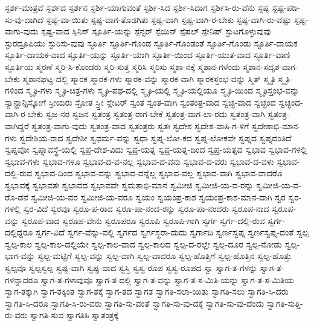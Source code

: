 {ಸ್ಪರ್ಶ-ಮಾತ್ರವೆ
ಸ್ಪರ್ಶದ
ಸ್ಪರ್ಶನ
ಸ್ಪರ್ಶಿ-ಯಾಗುವಂತೆ
ಸ್ಪರ್ಶಿ-ಸಿದ
ಸ್ಪರ್ಶಿ-ಸಿದಾಗ
ಸ್ಪರ್ಶಿಸಿ-ರು-ವೆನು
ಸ್ಪಷ್ಟ
ಸ್ಪಷ್ಟ-ಪಡಿ-ಸು-ವು-ದಾಗಿದೆ
ಸ್ಪಷ್ಟ-ವಾ-ಯಿತು
ಸ್ಪಷ್ಟ-ವಾಗ-ತೊಡಗಿತು
ಸ್ಪಷ್ಟ-ವಾಗಿ
ಸ್ಪಷ್ಟ-ವಾಗಿ-ರ-ಬೇಕು
ಸ್ಪಷ್ಟ-ವಾಗಿ-ರು-ವಷ್ಟು
ಸ್ಪಷ್ಟ-ವಾಗು-ವುದು
ಸ್ಪಷ್ಟ-ವಾದ
ಸ್ಪಿನಿಸ್
ಸ್ಪೂರ್ತಿ-ಯನ್ನು
ಸ್ಪೆನ್ಸರ್
ಸ್ಪೆಯಿನ್
ಸ್ಪೆಷಲ್
ಸ್ಪೇನಿಷ್
ಸ್ಫುಟಗೊಳ್ಳುವುವು
ಸ್ಫುರದ್ರೂಪಿಯು
ಸ್ಫುರಿಸು-ವುವು
ಸ್ಫೂರ್ತಿ
ಸ್ಫೂರ್ತಿ-ಗೊಂಡ
ಸ್ಫೂರ್ತಿ-ಗೊಂಡಂತೆ
ಸ್ಫೂರ್ತಿ-ಗೊಂಡು
ಸ್ಫೂರ್ತಿ-ದಾಯಕ
ಸ್ಫೂರ್ತಿ-ದಾಯಕ-ವಾದ
ಸ್ಫೂರ್ತಿ-ಯನ್ನು
ಸ್ಫೂರ್ತಿ-ಯಾಗಿ
ಸ್ಫೂರ್ತಿ-ಯಿಂದ
ಸ್ಫೂರ್ತಿ-ಯುತ-ವಾದ
ಸ್ಫೂರ್ತಿ-ವಾಣಿ
ಸ್ಫೂರ್ತಿಯ
ಸ್ಮರಣೆ
ಸ್ಮರಿ-ಸಿ-ಕೊಂಡರು
ಸ್ಮರಿ-ಸುತ್ತ
ಸ್ಮರಿಸಿ
ಸ್ಮರಿಸು
ಸ್ಮಶಾ-ನಕ್ಕೆ
ಸ್ಮಶಾನ-ಗಳೆಂದು
ಸ್ಮಶಾನ-ಸದೃಶ-ವಾಗ-ಬೇಕು
ಸ್ಮಶಾನಘಟ್ಟ-ದಲ್ಲಿ
ಸ್ಮಾರಕ
ಸ್ಮಾರಕ-ಗಳು
ಸ್ಮಾರಕ-ವನ್ನು
ಸ್ಮಾರಕ-ವಾಗಿ
ಸ್ಮಾರಕಸ್ತಂಭ-ವನ್ನು
ಸ್ಮಿತ್
ಸ್ಮೃತಿ
ಸ್ಮೃತಿ-ಗಳಿಂದ
ಸ್ಮೃತಿ-ಗಳು
ಸ್ಮೃತಿ-ಚಿತ್ರ-ಗಳು
ಸ್ಮೃತಿ-ಪಥ-ದಲ್ಲಿ
ಸ್ಮೃತಿ-ಯಲ್ಲಿ
ಸ್ಮೃತಿ-ಯಲ್ಲಿಯೂ
ಸ್ಮೃತಿ-ಯಿಂದ
ಸ್ಮೃತಿಸ್ತಂಭ-ವನ್ನು
ಸ್ಯಾನ್ಫ್ರಾನ್ಸಿಸ್ಕೋಗೆ
ಸ್ರೀಯರು
ಸ್ರೋತ
ಸ್ರ್ತೀ
ಸ್ಲೇಟರ್
ಸ್ವಂತ
ಸ್ವಂತ-ವಾಗಿ
ಸ್ವಂತಂತ್ರ-ವಾದ
ಸ್ವಚ್ಛ-ವಾದ
ಸ್ವಚ್ಛಂದ
ಸ್ವಚ್ಛಂದ-ವಾಗಿ-ರ-ಬೇಕು
ಸ್ವಜ-ನರ
ಸ್ವಜನ
ಸ್ವತಂತ್ರ
ಸ್ವತಂತ್ರ-ರಾಗ-ಬೇಕೆ
ಸ್ವತಂತ್ರ-ವಾಗ-ಲಾ-ರದು
ಸ್ವತಂತ್ರ-ವಾಗಿ
ಸ್ವತಂತ್ರ-ವಾಗಿದ್ದರೆ
ಸ್ವತಂತ್ರ-ವಾಗು-ವುದು
ಸ್ವತಂತ್ರ-ವಾದ
ಸ್ವತಂತ್ರರು
ಸ್ವತಃ
ಸ್ವದೇಶ
ಸ್ವದೇಶ-ವಾಸಿ-ಗ-ಳಿಗೆ
ಸ್ವದೇಶಾಭಿ-ಮಾನ-ಗಳು
ಸ್ವದೇಶಿಯ-ರಾದ
ಸ್ವದೇಶೀ
ಸ್ವಧರ್ಮ-ವನ್ನು
ಸ್ವಧಾ
ಸ್ವಪ್ನ-ಲೋ-ಕದ
ಸ್ವಪ್ನ-ಲೋಕವೇ
ಸ್ವಪ್ನದ
ಸ್ವಪ್ನದಂತಿದೆ
ಸ್ವಪ್ನವೋ
ಸ್ವಪ್ನಾವಸ್ಥೆ-ಯಲ್ಲಿ
ಸ್ವಪ್ರ-ದೇಶ-ವಿದು
ಸ್ವಪ್ರ-ಯತ್ನ
ಸ್ವಪ್ರ-ಯತ್ನ-ದಿಂದ
ಸ್ವಪ್ರ-ಯತ್ನದ
ಸ್ವಭಾವ
ಸ್ವಭಾವ-ಗಳಲ್ಲಿ
ಸ್ವಭಾವ-ಗಳು
ಸ್ವಭಾವ-ಗಳೂ
ಸ್ವಭಾವ-ದ-ವ-ನಲ್ಲ
ಸ್ವಭಾವ-ದ-ವನು
ಸ್ವಭಾವ-ದ-ವರು
ಸ್ವಭಾವ-ದ-ವಳು
ಸ್ವಭಾವ-ದಲ್ಲಿ-ರುವ
ಸ್ವಭಾವ-ದಿಂದ
ಸ್ವಭಾವ-ವನ್ನು
ಸ್ವಭಾವ-ವನ್ನೆಲ್ಲ
ಸ್ವಭಾವ-ವಲ್ಲ
ಸ್ವಭಾವ-ವಾಗಿ
ಸ್ವಭಾವ-ವಾದರೊ
ಸ್ವಭಾವಕ್ಕೆ
ಸ್ವಭಾವತಃ
ಸ್ವಭಾವದ
ಸ್ವಭಾವವೇ
ಸ್ವಮತಾಭಿ-ಮಾನ
ಸ್ವಮೀಜಿ
ಸ್ವಮೀಜಿ-ಯ-ವ-ರನ್ನು
ಸ್ವಮೀಜಿ-ಯ-ವ-ರೊ-ಡನೆ
ಸ್ವಮೀಜಿ-ಯ-ವರ
ಸ್ವಮೀಜಿ-ಯ-ವರೂ
ಸ್ವಯಂ
ಸ್ವಯಂಪ್ರ-ಕಾಶ
ಸ್ವಯಂಪ್ರ-ಕಾಶ-ಮಾನ-ವಾಗಿ
ಸ್ವರ
ಸ್ವರ-ಗಳಲ್ಲಿ
ಸ್ವರ-ವಿದೆ
ಸ್ವರವೂ
ಸ್ವರೂ-ಪ-ರಾದ
ಸ್ವರೂ-ಪಾ-ನಂದ-ರನ್ನು
ಸ್ವರೂ-ಪಾ-ನಂದರು
ಸ್ವರೂಪ-ನಾದ
ಸ್ವರೂಪ-ವನ್ನು
ಸ್ವರೂಪ-ವಾದ
ಸ್ವರೂಪ-ವೇನು
ಸ್ವರೂಪರೂ
ಸ್ವರೂಪಿ
ಸ್ವರೂಪಿ-ಗಾಗಿ
ಸ್ವರ್ಗ
ಸ್ವರ್ಗ-ದಲ್ಲಿ-ರುವ
ಸ್ವರ್ಗ-ದಲ್ಲಿದ್ದರೂ
ಸ್ವರ್ಗ-ವಿದೆ
ಸ್ವರ್ಗ-ವೆನ್ನು-ವಲ್ಲಿ
ಸ್ವರ್ಗದ
ಸ್ವರ್ಗಸ್ಥರಾ-ದುದು
ಸ್ವರ್ಗಾದಿ
ಸ್ವರ್ಣಸ್ವಪ್ನ
ಸ್ವರ್ಣಸ್ವಪ್ನ-ದಂತೆ
ಸ್ವಲ್ಪ
ಸ್ವಲ್ಪ-ಕಾಲ
ಸ್ವಲ್ಪ-ಕಾಲ-ದಲ್ಲಿಯೇ
ಸ್ವಲ್ಪ-ಕಾಲ-ವಾದ
ಸ್ವಲ್ಪ-ಕಾಲದ
ಸ್ವಲ್ಪ-ದ-ರಲ್ಲೇ
ಸ್ವಲ್ಪ-ದೂರ
ಸ್ವಲ್ಪ-ನೋಡು
ಸ್ವಲ್ಪ-ಭಾಗ-ವನ್ನು
ಸ್ವಲ್ಪ-ಮಟ್ಟಿಗೆ
ಸ್ವಲ್ಪ-ವನ್ನು
ಸ್ವಲ್ಪ-ವಾಗಿ
ಸ್ವಲ್ಪ-ವಾದರೂ
ಸ್ವಲ್ಪ-ಹೊತ್ತಿಗೆ
ಸ್ವಲ್ಪ-ಹೊತ್ತಿನ
ಸ್ವಲ್ಪ-ಹೊತ್ತು
ಸ್ವಲ್ಪವೂ
ಸ್ವಲ್ಪಸ್ವಲ್ಪ
ಸ್ವಷ್ಟ-ವಾಗಿ
ಸ್ವಷ್ಟ-ವಾದ
ಸ್ವಸ್ತಿ
ಸ್ವಸ್ವ-ರೂಪ
ಸ್ವಸ್ವ-ರೂಪದ
ಸ್ವಾ
ಸ್ವಾಗ-ತ-ಗಳನ್ನು
ಸ್ವಾಗ-ತ-ಗಳನ್ನಾದರೂ
ಸ್ವಾಗ-ತ-ಗಳಾವುವೂ
ಸ್ವಾಗ-ತ-ದಲ್ಲಿ
ಸ್ವಾಗ-ತ-ವನ್ನು
ಸ್ವಾಗ-ತ-ಸ-ಮಿತಿ-ಯನ್ನು
ಸ್ವಾಗ-ತ-ಸ-ಮಿತಿಯ
ಸ್ವಾಗ-ತಕ್ಕಾಗಿ
ಸ್ವಾಗ-ತಕ್ಕಿಂತ
ಸ್ವಾಗ-ತಕ್ಕೆ
ಸ್ವಾಗ-ತದ
ಸ್ವಾಗತ
ಸ್ವಾಗತಿ-ಸಲಾ-ಯಿತು
ಸ್ವಾಗತಿ-ಸಲು
ಸ್ವಾಗತಿ-ಸಿ-ದರು
ಸ್ವಾಗತಿ-ಸಿ-ದರೂ
ಸ್ವಾಗತಿ-ಸಿ-ರು-ವರು
ಸ್ವಾಗತಿ-ಸು-ವಂತೆ
ಸ್ವಾಗತಿ-ಸು-ವು-ದಕ್ಕೆ
ಸ್ವಾಗತಿ-ಸು-ವು-ದೆಂದು
ಸ್ವಾಗತಿ-ಸುತ್ತಿ-ರು-ವರು
ಸ್ವಾಗತಿ-ಸುವ
ಸ್ವಾಗತಿಸಿ
ಸ್ವಾತಂತ್ರಕ್ಕೆ
}
